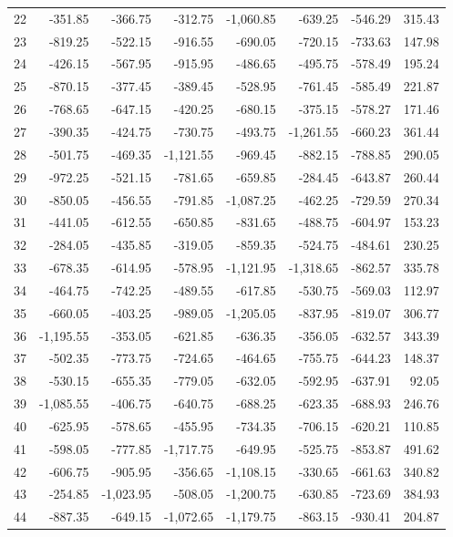 \begin{longtable}{rrrrrrrr}
22 & -351.85 & -366.75 & -312.75 & -1,060.85 & -639.25 & -546.29 & 315.43  \\
23 & -819.25 & -522.15 & -916.55 & -690.05 & -720.15 & -733.63 & 147.98  \\
24 & -426.15 & -567.95 & -915.95 & -486.65 & -495.75 & -578.49 & 195.24  \\
25 & -870.15 & -377.45 & -389.45 & -528.95 & -761.45 & -585.49 & 221.87  \\
26 & -768.65 & -647.15 & -420.25 & -680.15 & -375.15 & -578.27 & 171.46  \\
27 & -390.35 & -424.75 & -730.75 & -493.75 & -1,261.55 & -660.23 & 361.44  \\
28 & -501.75 & -469.35 & -1,121.55 & -969.45 & -882.15 & -788.85 & 290.05  \\
29 & -972.25 & -521.15 & -781.65 & -659.85 & -284.45 & -643.87 & 260.44  \\
30 & -850.05 & -456.55 & -791.85 & -1,087.25 & -462.25 & -729.59 & 270.34  \\
31 & -441.05 & -612.55 & -650.85 & -831.65 & -488.75 & -604.97 & 153.23  \\
32 & -284.05 & -435.85 & -319.05 & -859.35 & -524.75 & -484.61 & 230.25  \\
33 & -678.35 & -614.95 & -578.95 & -1,121.95 & -1,318.65 & -862.57 & 335.78  \\
34 & -464.75 & -742.25 & -489.55 & -617.85 & -530.75 & -569.03 & 112.97  \\
35 & -660.05 & -403.25 & -989.05 & -1,205.05 & -837.95 & -819.07 & 306.77  \\
36 & -1,195.55 & -353.05 & -621.85 & -636.35 & -356.05 & -632.57 & 343.39  \\
37 & -502.35 & -773.75 & -724.65 & -464.65 & -755.75 & -644.23 & 148.37  \\
38 & -530.15 & -655.35 & -779.05 & -632.05 & -592.95 & -637.91 & 92.05  \\
39 & -1,085.55 & -406.75 & -640.75 & -688.25 & -623.35 & -688.93 & 246.76  \\
40 & -625.95 & -578.65 & -455.95 & -734.35 & -706.15 & -620.21 & 110.85  \\
41 & -598.05 & -777.85 & -1,717.75 & -649.95 & -525.75 & -853.87 & 491.62  \\
42 & -606.75 & -905.95 & -356.65 & -1,108.15 & -330.65 & -661.63 & 340.82  \\
43 & -254.85 & -1,023.95 & -508.05 & -1,200.75 & -630.85 & -723.69 & 384.93  \\
44 & -887.35 & -649.15 & -1,072.65 & -1,179.75 & -863.15 & -930.41 & 204.87  \\

\end{longtable}
